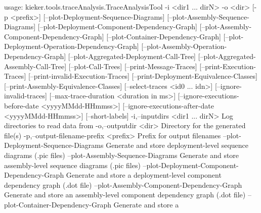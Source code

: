 usage: kieker.tools.traceAnalysis.TraceAnalysisTool -i <dir1 ... dirN> -o <dir>
       [-p <prefix>] [--plot-Deployment-Sequence-Diagrams]
       [--plot-Assembly-Sequence-Diagrams]
       [--plot-Deployment-Component-Dependency-Graph]
       [--plot-Assembly-Component-Dependency-Graph]
       [--plot-Container-Dependency-Graph]
       [--plot-Deployment-Operation-Dependency-Graph]
       [--plot-Assembly-Operation-Dependency-Graph]
       [--plot-Aggregated-Deployment-Call-Tree]
       [--plot-Aggregated-Assembly-Call-Tree] [--plot-Call-Trees]
       [--print-Message-Traces] [--print-Execution-Traces]
       [--print-invalid-Execution-Traces]
       [--print-Deployment-Equivalence-Classes]
       [--print-Assembly-Equivalence-Classes] [--select-traces <id0 ... idn>]
       [--ignore-invalid-traces] [--max-trace-duration <duration in ms>]
       [--ignore-executions-before-date <yyyyMMdd-HHmmss>]
       [--ignore-executions-after-date <yyyyMMdd-HHmmss>] 
       [--short-labels]
 -i,--inputdirs <dir1 ... dirN>                         Log directories to read
                                                        data from
 -o,--outputdir <dir>                                   Directory for the
                                                        generated file(s)
 -p,--output-filename-prefix <prefix>                   Prefix for output
                                                        filenames
    --plot-Deployment-Sequence-Diagrams                 Generate and store
                                                        deployment-level
                                                        sequence diagrams (.pic
                                                        files)
    --plot-Assembly-Sequence-Diagrams                   Generate and store
                                                        assembly-level sequence
                                                        diagrams (.pic files)
    --plot-Deployment-Component-Dependency-Graph        Generate and store a
                                                        deployment-level
                                                        component dependency
                                                        graph (.dot file)
    --plot-Assembly-Component-Dependency-Graph          Generate and store an
                                                        assembly-level component
                                                        dependency graph (.dot
                                                        file)
    --plot-Container-Dependency-Graph                   Generate and store a
